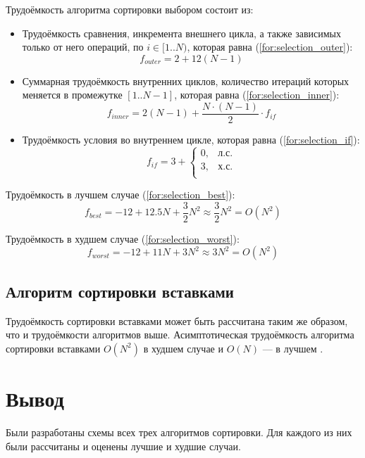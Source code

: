 Трудоёмкость алгоритма сортировки выбором состоит из:
\begin{itemize}
	\item Трудоёмкость сравнения, инкремента внешнего цикла, а также зависимых только от него операций, по $i \in [1..N)$, которая равна (\ref{for:selection_outer}):
	\begin{equation}
		\label{for:selection_outer}
		f_{outer} = 2 + 12(N - 1)
	\end{equation}
	\item Суммарная трудоёмкость внутренних циклов, количество итераций которых меняется в промежутке $[1..N-1]$, которая равна (\ref{for:selection_inner}):
	\begin{equation}
		\label{for:selection_inner}
		f_{inner} = 2(N - 1) + \frac{N \cdot (N - 1)}{2} \cdot f_{if}
	\end{equation}
	\item Трудоёмкость условия во внутреннем цикле, которая равна (\ref{for:selection_if}):
	\begin{equation}
		\label{for:selection_if}
		f_{if} = 3 + \begin{cases}
			0, & \text{л.с.}\\
			3, & \text{х.с.}\\
		\end{cases}
	\end{equation}
\end{itemize}

Трудоёмкость в лучшем случае (\ref{for:selection_best}):
\begin{equation}
	\label{for:selection_best}
	f_{best} = -12 + 12.5N + \frac{3}{2}N^2 \approx \frac{3}{2}N^2 = O(N^2)
\end{equation}

Трудоёмкость в худшем случае (\ref{for:selection_worst}):
\begin{equation}
	\label{for:selection_worst}
	f_{worst} = -12 + 11N + 3N^2 \approx 3N^2 = O(N^2)
\end{equation}





\subsection{Алгоритм сортировки вставками}

Трудоёмкость сортировки вставками может быть рассчитана таким же образом, что и трудоёмкости алгоритмов выше. Асимптотическая трудоёмкость алгоритма сортировки вставками $O(N^2)$ в худшем случае и $O(N)$ --- в лучшем \cite{insert}.





\section*{Вывод}

Были разработаны схемы всех трех алгоритмов сортировки. Для каждого из них были рассчитаны и оценены лучшие и худшие случаи.


